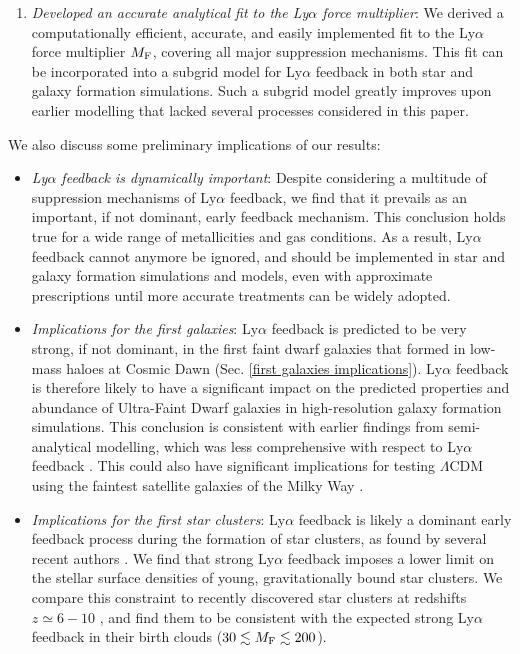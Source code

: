 \documentclass[fleqn,usenatbib]{mnras}
\begin{document}
\begin{enumerate}
    \item \textit{Developed an accurate analytical fit to the Ly$\alpha$ force multiplier}: We derived a computationally efficient, accurate, and easily implemented fit to the Ly$\alpha$ force multiplier $M_{\rm F}$, covering all major suppression mechanisms. This fit can be incorporated into a subgrid model for Ly$\alpha$ feedback in both star and galaxy formation simulations. Such a subgrid model greatly improves upon earlier modelling that lacked several processes considered in this paper.
    
\end{enumerate}
We also discuss some preliminary implications of our results:
\begin{itemize}
    \item \textit{Ly$\alpha$ feedback is dynamically important}: Despite considering a multitude of suppression mechanisms of Ly$\alpha$ feedback, we find that it prevails as an important, if not dominant, early feedback mechanism. This conclusion holds true for a wide range of metallicities and gas conditions. As a result, Ly$\alpha$ feedback cannot anymore be ignored, and should be implemented in star and galaxy formation simulations and models, even with approximate prescriptions until more accurate treatments can be widely adopted. \\

    \item \textit{Implications for the first galaxies}: Ly$\alpha$ feedback is predicted to be very strong, if not dominant, in the first faint dwarf galaxies that formed in low-mass haloes at Cosmic Dawn (Sec. \ref{first galaxies implications}). Ly$\alpha$ feedback is therefore likely to have a significant impact on the predicted properties and abundance of Ultra-Faint Dwarf galaxies in high-resolution galaxy formation simulations. This conclusion is consistent with earlier findings from semi-analytical modelling, which was less comprehensive with respect to Ly$\alpha$ feedback \citep{Nebrin2022}. This could also have significant implications for testing $\Lambda$CDM using the faintest satellite galaxies of the Milky Way \citep{Nadler2020}.   \\

    \item \textit{Implications for the first star clusters}: Ly$\alpha$ feedback is likely a dominant early feedback process during the formation of star clusters, as found by several recent authors \citep{Abe2018, Kimm2018, Nebrin2022}. We find that strong Ly$\alpha$ feedback imposes a lower limit on the stellar surface densities of young, gravitationally bound star clusters. We compare this constraint to recently discovered star clusters at redshifts $z \simeq 6-10$ \citep[][see Fig. \ref{StarClusters}]{Vanzella2023, Adamo2024, Mowla2024}, and find them to be consistent with the expected strong Ly$\alpha$ feedback in their birth clouds ($30 \lesssim M_{\rm F} \lesssim 200$).   \\



\end{itemize}
\end{document}
